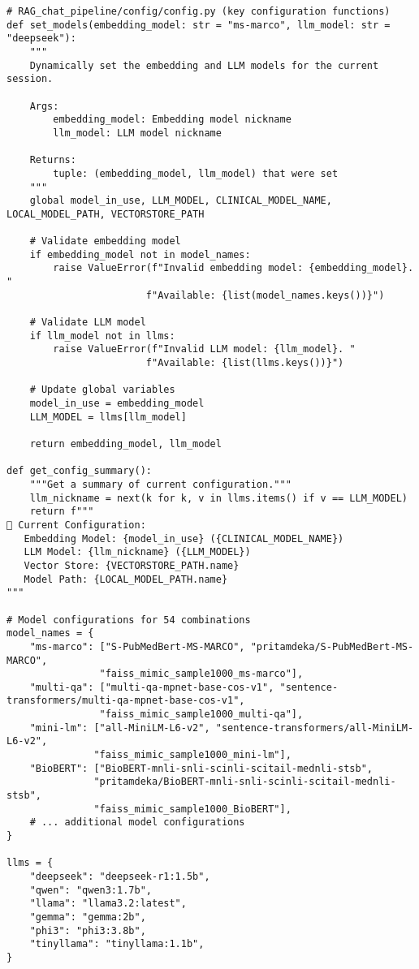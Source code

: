 \begin{verbatim}
# RAG_chat_pipeline/config/config.py (key configuration functions)
def set_models(embedding_model: str = "ms-marco", llm_model: str = "deepseek"):
    """
    Dynamically set the embedding and LLM models for the current session.
    
    Args:
        embedding_model: Embedding model nickname 
        llm_model: LLM model nickname
    
    Returns:
        tuple: (embedding_model, llm_model) that were set
    """
    global model_in_use, LLM_MODEL, CLINICAL_MODEL_NAME, LOCAL_MODEL_PATH, VECTORSTORE_PATH

    # Validate embedding model
    if embedding_model not in model_names:
        raise ValueError(f"Invalid embedding model: {embedding_model}. "
                        f"Available: {list(model_names.keys())}")

    # Validate LLM model
    if llm_model not in llms:
        raise ValueError(f"Invalid LLM model: {llm_model}. "
                        f"Available: {list(llms.keys())}")

    # Update global variables
    model_in_use = embedding_model
    LLM_MODEL = llms[llm_model]

    return embedding_model, llm_model

def get_config_summary():
    """Get a summary of current configuration."""
    llm_nickname = next(k for k, v in llms.items() if v == LLM_MODEL)
    return f"""
🔧 Current Configuration:
   Embedding Model: {model_in_use} ({CLINICAL_MODEL_NAME})
   LLM Model: {llm_nickname} ({LLM_MODEL})
   Vector Store: {VECTORSTORE_PATH.name}
   Model Path: {LOCAL_MODEL_PATH.name}
"""

# Model configurations for 54 combinations
model_names = {
    "ms-marco": ["S-PubMedBert-MS-MARCO", "pritamdeka/S-PubMedBert-MS-MARCO", 
                "faiss_mimic_sample1000_ms-marco"],
    "multi-qa": ["multi-qa-mpnet-base-cos-v1", "sentence-transformers/multi-qa-mpnet-base-cos-v1", 
                "faiss_mimic_sample1000_multi-qa"],
    "mini-lm": ["all-MiniLM-L6-v2", "sentence-transformers/all-MiniLM-L6-v2", 
               "faiss_mimic_sample1000_mini-lm"],
    "BioBERT": ["BioBERT-mnli-snli-scinli-scitail-mednli-stsb", 
               "pritamdeka/BioBERT-mnli-snli-scinli-scitail-mednli-stsb", 
               "faiss_mimic_sample1000_BioBERT"],
    # ... additional model configurations
}

llms = {
    "deepseek": "deepseek-r1:1.5b",
    "qwen": "qwen3:1.7b",
    "llama": "llama3.2:latest",
    "gemma": "gemma:2b",
    "phi3": "phi3:3.8b",
    "tinyllama": "tinyllama:1.1b",
}
\end{verbatim}

